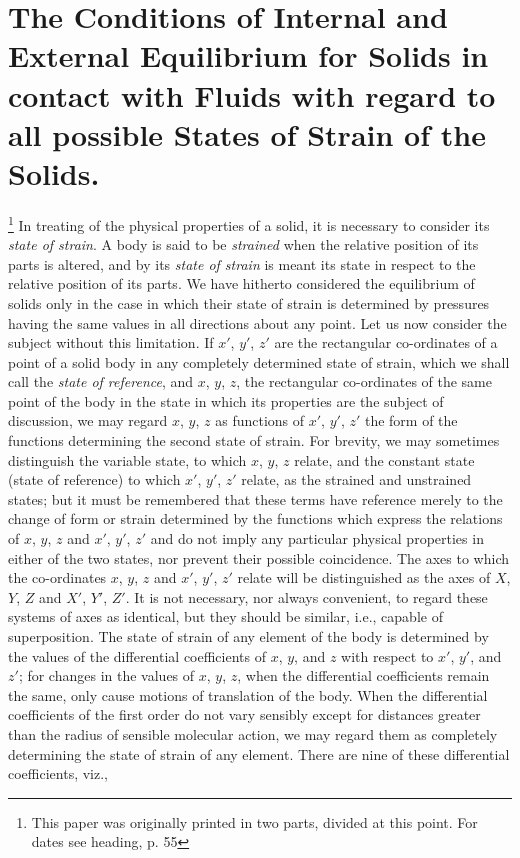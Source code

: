 \documentclass[12pt]{article}
\begin{document}
\section{The Conditions of Internal and External Equilibrium for Solids in contact with Fluids with regard to all possible States of Strain of the Solids.}\footnote{This paper was originally printed in two parts, divided at this point. For dates see heading, p. 55}
In treating of the physical properties of a solid, it is necessary to consider its \textit{state of strain}. A body is said to be \textit{strained} when the relative position of its parts is altered, and by its \textit{state of strain} is meant its state in respect to the relative position of its parts. We have hitherto considered the equilibrium of solids only in the case in which their state of strain is determined by pressures having the same values in all directions about any point. Let us now consider the subject without this limitation.
If $x'$, $y'$, $z'$ are the rectangular co-ordinates of a point of a solid body in any completely determined state of strain, which we shall call the \textit{state of reference}, and $x$, $y$, $z$, the rectangular co-ordinates of the same point of the body in the state in which its properties are the subject of discussion, we may regard $x$, $y$, $z$ as functions of $x'$, $y'$, $z'$ the form of the functions determining the second state of strain. For brevity, we may sometimes distinguish the variable state, to which $x$, $y$, $z$ relate, and the constant state (state of reference) to which $x'$, $y'$, $z'$ relate, as the strained and unstrained states; but it must be remembered that these terms have reference merely to the change of form or strain determined by the functions which express the relations of $x$, $y$, $z$ and $x'$, $y'$, $z'$ and do not imply any particular physical properties in either of the two states, nor prevent their possible coincidence. The axes to which the co-ordinates $x$, $y$, $z$ and $x'$, $y'$, $z'$ relate will be distinguished as the axes of $X$, $Y$, $Z$ and $X'$, $Y'$, $Z'$. It is not necessary, nor always convenient, to regard these systems of axes as identical, but they should be similar, i.e., capable of superposition.
The state of strain of any element of the body is determined by the values of the differential coefficients of $x$, $y$, and $z$ with respect to $x'$, $y'$, and $z'$; for changes in the values of $x$, $y$, $z$, when the differential coefficients remain the same, only cause motions of translation of the body. When the differential coefficients of the first order do not vary sensibly except for distances greater than the radius of sensible molecular action, we may regard them as completely determining the state of strain of any element. There are nine of these differential coefficients, viz.,
\end{document}
